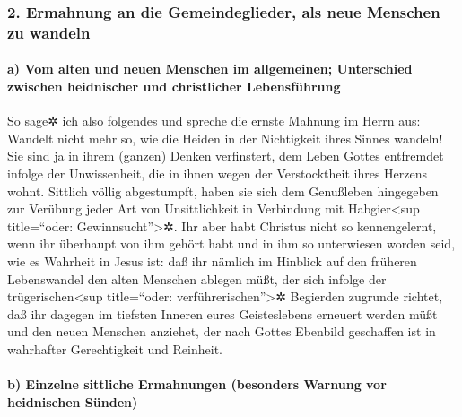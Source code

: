 \hypertarget{ermahnung-an-die-gemeindeglieder-als-neue-menschen-zu-wandeln}{%
\subsubsection{2. Ermahnung an die Gemeindeglieder, als neue Menschen zu
wandeln}\label{ermahnung-an-die-gemeindeglieder-als-neue-menschen-zu-wandeln}}

\hypertarget{a-vom-alten-und-neuen-menschen-im-allgemeinen-unterschied-zwischen-heidnischer-und-christlicher-lebensfuxfchrung}{%
\paragraph{a) Vom alten und neuen Menschen im allgemeinen; Unterschied
zwischen heidnischer und christlicher
Lebensführung}\label{a-vom-alten-und-neuen-menschen-im-allgemeinen-unterschied-zwischen-heidnischer-und-christlicher-lebensfuxfchrung}}

 So sage✲ ich also folgendes und spreche die ernste
Mahnung im Herrn aus: Wandelt nicht mehr so, wie die Heiden in der
Nichtigkeit ihres Sinnes wandeln!  Sie sind ja in ihrem
(ganzen) Denken verfinstert, dem Leben Gottes entfremdet infolge der
Unwissenheit, die in ihnen wegen der Verstocktheit ihres Herzens wohnt.
 Sittlich völlig abgestumpft, haben sie sich dem
Genußleben hingegeben zur Verübung jeder Art von Unsittlichkeit in
Verbindung mit Habgier\textless sup title=``oder:
Gewinnsucht''\textgreater✲.  Ihr aber habt Christus nicht
so kennengelernt,  wenn ihr überhaupt von ihm gehört habt
und in ihm so unterwiesen worden seid, wie es Wahrheit in Jesus ist:
 daß ihr nämlich im Hinblick auf den früheren
Lebenswandel den alten Menschen ablegen müßt, der sich infolge der
trügerischen\textless sup title=``oder: verführerischen''\textgreater✲
Begierden zugrunde richtet,  daß ihr dagegen im tiefsten
Inneren eures Geisteslebens erneuert werden müßt  und den
neuen Menschen anziehet, der nach Gottes Ebenbild geschaffen ist in
wahrhafter Gerechtigkeit und Reinheit.

\hypertarget{b-einzelne-sittliche-ermahnungen-besonders-warnung-vor-heidnischen-suxfcnden}{%
\paragraph{b) Einzelne sittliche Ermahnungen (besonders Warnung vor
heidnischen
Sünden)}\label{b-einzelne-sittliche-ermahnungen-besonders-warnung-vor-heidnischen-suxfcnden}}

